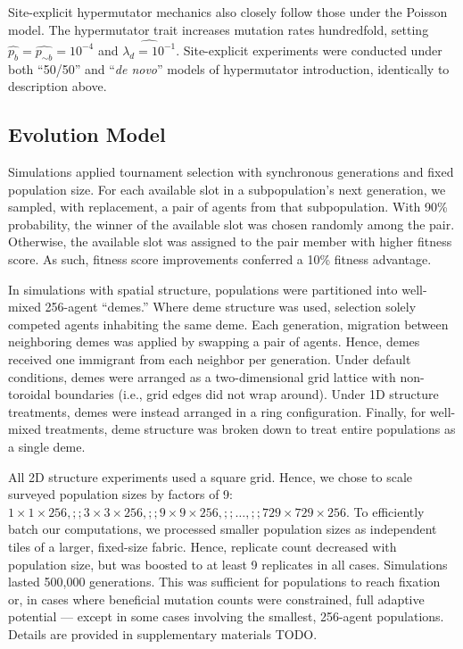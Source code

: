 Site-explicit hypermutator mechanics also closely follow those under the Poisson model.
The hypermutator trait increases mutation rates hundredfold, setting $\hat{p_{b}} = \hat{p_{\sim b}} = 10^{-4}$ and $\hat{\lambda_d=10^{-1}}$.
Site-explicit experiments were conducted under both ``50/50'' and ``\textit{de novo}'' models of hypermutator introduction, identically to description above.

\subsection{Evolution Model} \label{sec:evolution}

Simulations applied tournament selection with synchronous generations and fixed population size.
For each available slot in a subpopulation's next generation, we sampled, with replacement, a pair of agents from that subpopulation.
With 90\% probability, the winner of the available slot was chosen randomly among the pair.
Otherwise, the available slot was assigned to the pair member with higher fitness score.
As such, fitness score improvements conferred a 10\% fitness advantage.

In simulations with spatial structure, populations were partitioned into well-mixed 256-agent ``demes.''
Where deme structure was used, selection solely competed agents inhabiting the same deme.
Each generation, migration between neighboring demes was applied by swapping a pair of agents.
Hence, demes received one immigrant from each neighbor per generation.
Under default conditions, demes were arranged as a two-dimensional grid lattice with non-toroidal boundaries (i.e., grid edges did not wrap around).
Under 1D structure treatments, demes were instead arranged in a ring configuration.
Finally, for well-mixed treatments, deme structure was broken down to treat entire populations as a single deme.

All 2D structure experiments used a square grid.
Hence, we chose to scale surveyed population sizes by factors of 9: $1 \times 1 \times 256,;; 3 \times 3 \times 256,;; 9 \times 9 \times 256,;; \ldots,;; 729 \times 729 \times 256$.
To efficiently batch our computations, we processed smaller population sizes as independent tiles of a larger, fixed-size fabric.
Hence, replicate count decreased with population size, but was boosted to at least 9 replicates in all cases.
Simulations lasted 500,000 generations.
This was sufficient for populations to reach fixation or, in cases where beneficial mutation counts were constrained, full adaptive potential --- except in some cases involving the smallest, 256-agent populations.
Details are provided in supplementary materials TODO.


